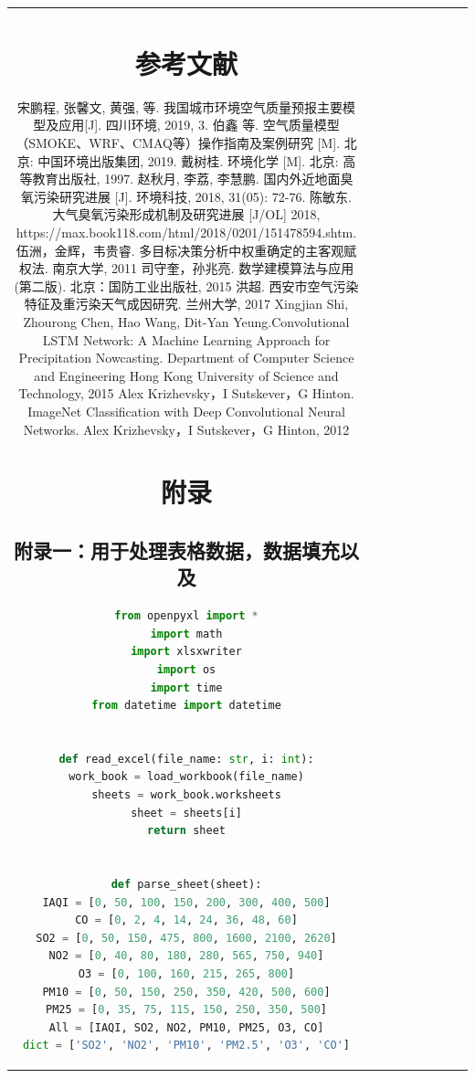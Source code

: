 \documentclass[bwprint]{gmcmthesis}
\numberwithin{figure}{section}
\begin{document}
\begin{table}
\begin{center}
{\begin{tabular}[ht]{|c|c|c|c|c|c|c|c|c|}
\section{参考文献}
\begin{thebibliography}{1.2}%
\setlength{\itemsep}{-2mm}
 \bibitem{ref1}
 宋鹏程, 张馨文, 黄强, 等. 我国城市环境空气质量预报主要模型及应用[J]. 四川环境, 2019, 3.
 \bibitem{ref2}
 伯鑫 等. 空气质量模型（SMOKE、WRF、CMAQ等）操作指南及案例研究 [M]. 北京: 中国环境出版集团, 2019.
 \bibitem{ref3}
 戴树桂. 环境化学 [M]. 北京: 高等教育出版社, 1997.
 \bibitem{ref4}
 赵秋月, 李荔, 李慧鹏. 国内外近地面臭氧污染研究进展 [J]. 环境科技, 2018, 31(05): 72-76.
 \bibitem{ref5}
 陈敏东. 大气臭氧污染形成机制及研究进展 [J/OL] 2018, https://max.book118.com/html/2018/0201/151478594.shtm. 
 \bibitem{ref6}
 伍洲，金辉，韦贵睿. 多目标决策分析中权重确定的主客观赋权法. 南京大学, 2011
 \bibitem{ref7}
 司守奎，孙兆亮. 数学建模算法与应用(第二版). 北京：国防工业出版社, 2015
 \bibitem{ref8}
 洪超. 西安市空气污染特征及重污染天气成因研究. 兰州大学, 2017
 \bibitem{ref9}
 Xingjian Shi, Zhourong Chen, Hao Wang, Dit-Yan Yeung.Convolutional LSTM Network: A Machine Learning Approach for Precipitation Nowcasting.
 Department of Computer Science and Engineering Hong Kong University of Science and Technology, 2015
 \bibitem{ref10}
 Alex Krizhevsky，I Sutskever，G Hinton. ImageNet Classification with Deep Convolutional Neural Networks. Alex Krizhevsky，I Sutskever，G Hinton, 2012
 
\end{thebibliography}

\newpage
\appendix
\section{附录}
\subsection{附录一：用于处理表格数据，数据填充以及}
\begin{lstlisting}[language=Python] 
from openpyxl import *
import math
import xlsxwriter
import os
import time
from datetime import datetime


def read_excel(file_name: str, i: int):
work_book = load_workbook(file_name)
sheets = work_book.worksheets
sheet = sheets[i]
return sheet


def parse_sheet(sheet):
IAQI = [0, 50, 100, 150, 200, 300, 400, 500]
CO = [0, 2, 4, 14, 24, 36, 48, 60]
SO2 = [0, 50, 150, 475, 800, 1600, 2100, 2620]
NO2 = [0, 40, 80, 180, 280, 565, 750, 940]
O3 = [0, 100, 160, 215, 265, 800]
PM10 = [0, 50, 150, 250, 350, 420, 500, 600]
PM25 = [0, 35, 75, 115, 150, 250, 350, 500]
All = [IAQI, SO2, NO2, PM10, PM25, O3, CO]
dict = ['SO2', 'NO2', 'PM10', 'PM2.5', 'O3', 'CO']


\end{lstlisting}
\end{tabular}}
\end{center}
\end{table}
\end{document}
